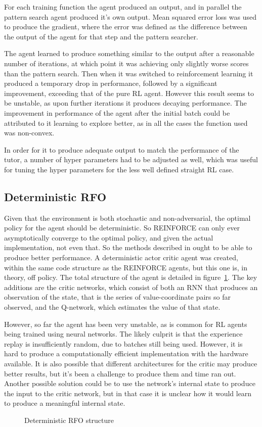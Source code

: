 For each training function the agent produced an output, and in parallel the pattern search agent produced it's own output. Mean squared error loss was used to produce the gradient, where the error was defined as the difference between the output of the agent for that step and the pattern searcher.

The agent learned to produce something similar to the output after a reasonable number of iterations, at which point it was achieving only slightly worse scores than the pattern search. Then when it was switched to reinforcement learning it produced a temporary drop in performance, followed by a significant improvement, exceeding that of the pure RL agent. However this result seems to be unstable, as upon further iterations it produces decaying performance. The improvement in performance of the agent after the initial batch could be attributed to it learning to explore better, as in all the cases the function used was non-convex.

In order for it to produce adequate output to match the performance of the tutor, a number of hyper parameters had to be adjusted as well, which was useful for tuning the hyper parameters for the less well defined straight RL case.

\subsection{Deterministic RFO}
Given that the environment is both stochastic and non-adversarial, the optimal policy for the agent should be deterministic. So REINFORCE can only ever asymptotically converge to the optimal policy, and given the actual implementation, not even that. So the methods described in \cite{DetContCont} ought to be able to produce better performance. A deterministic actor critic agent was created, within the same code structure as the REINFORCE agents, but this one is, in theory, off policy. The total structure of the agent is detailed in figure~\ref{fig:detrfo}. The key additions are the critic networks, which consist of both an RNN that produces an observation of the state, that is the series of value-coordinate pairs so far observed, and the Q-network, which estimates the value of that state.

However, so far the agent has been very unstable, as is common for RL agents being trained using neural networks. The likely culprit is that the experience replay is insufficiently random, due to batches still being used. However, it is hard to produce a computationally efficient implementation with the hardware available. It is also possible that different architectures for the critic may produce better results, but it's been a challenge to produce them and time ran out. Another possible solution could be to use the network's internal state to produce the input to the critic network, but in that case it is unclear how it would learn to produce a meaningful internal state.

\begin{figure}
\centering

\caption{Deterministic RFO structure}
\label{fig:detrfo}
\end{figure}

